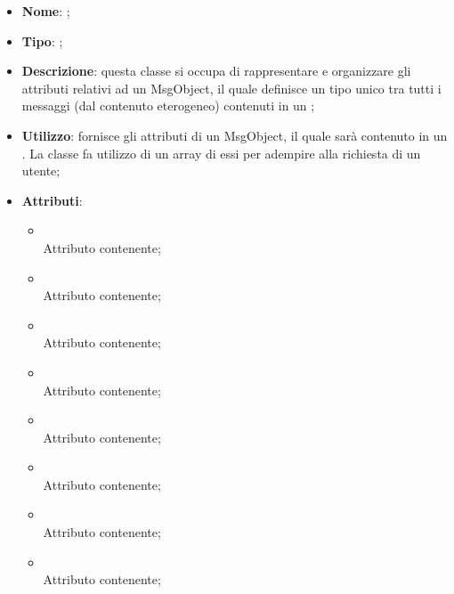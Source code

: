 \begin{itemize}
	\item \textbf{Nome}: ;
	\item \textbf{Tipo}: ;
	\item \textbf{Descrizione}: questa classe si occupa di rappresentare e organizzare gli attributi relativi ad un MsgObject, il quale definisce un tipo unico tra tutti i messaggi (dal contenuto eterogeneo) contenuti in un ;
	\item \textbf{Utilizzo}: fornisce gli attributi di un MsgObject, il quale sarà contenuto in un .
La classe  fa utilizzo di un array di essi per adempire alla richiesta di un utente;
	\item \textbf{Attributi}:
	\begin{itemize}
		\item[]  \\
		Attributo contenente;
		\item[]  \\
		Attributo contenente;
		\item[]  \\
		Attributo contenente;
		\item[]  \\
		Attributo contenente;
		\item[]  \\
		Attributo contenente;
		\item[]  \\
		Attributo contenente;
		\item[]  \\
		Attributo contenente;
		\item[]  \\
		Attributo contenente;
	\end{itemize}
\end{itemize}

